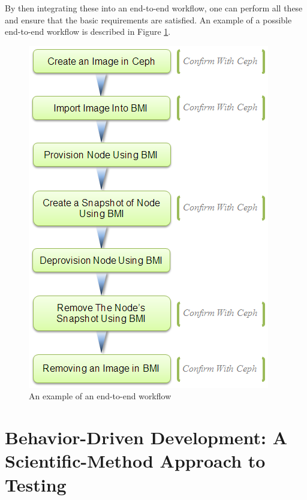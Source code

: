 By then integrating these into an end-to-end workflow, one can perform all these and ensure that the basic requirements are satisfied.  An example of a possible end-to-end workflow is described in Figure \ref{fig:end_to_end_workflow}. %

\begin{figure}[!h] %
\vspace{10mm}
\label{fig:bmi-workflow-end-to-end}
\begin{center}
\includegraphics[scale=0.7]{figures/bmi-workflow-with-image-cleanup-v2.png}
\end{center}
\caption{An example of an end-to-end workflow}
\label{fig:end_to_end_workflow}
\end{figure}

\section{Behavior-Driven Development: A Scientific-Method Approach to Testing}

